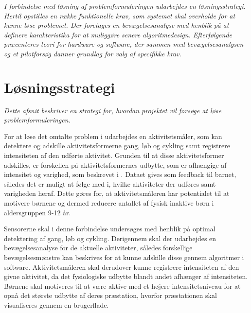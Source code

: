 \textit{I forbindelse med løsning af problemformuleringen udarbejdes en løsningsstrategi. Hertil opstilles en række funktionelle krav, som systemet skal overholde for at kunne løse problemet. Der foretages en bevægelsesanalyse med henblik på at definere karakteristika for at muliggøre senere algoritmedesign. Efterfølgende præcenteres teori for hardware og software, der sammen med bevægelsesanalysen og et pilotforsøg danner grundlag for valg af specifikke krav.}

\section{Løsningsstrategi}
\textit{Dette afsnit beskriver en strategi for, hvordan projektet vil forsøge at løse problemformuleringen.}

For at løse det omtalte problem i  udarbejdes en aktivitetsmåler, som kan detektere og adskille aktivitetsformerne gang, løb og cykling samt registrere intensiteten af den udførte aktivitet. Grunden til at disse aktivitetsformer adskilles, er forskellen på aktivitetsformernes udbytte, som er afhængige af intensitet og varighed, som beskrevet i . Dataet gives som feedback til barnet, således det er muligt at følge med i, hvilke aktiviteter der udføres samt varigheden heraf. Dette gøres for, at aktivitetsmåleren har potentialet til at motivere børnene og dermed reducere antallet af fysisk inaktive børn i aldersgruppen 9-12 år.

Sensorerne skal i denne forbindelse undersøges med henblik på optimal detektering af gang, løb og cykling. Derigennem skal der udarbejdes en bevægelsesanalyse for de aktuelle aktiviteter, således forskellige bevægelsesmønstre kan beskrives for at kunne adskille disse gennem algoritmer i software. Aktivitetsmåleren skal derudover kunne registrere intensiteten af den givne aktivitet, da det fysiologiske udbytte blandt andet afhænger af intensiteten. Børnene skal motiveres til at være aktive med et højere intensitetsniveau for at opnå det største udbytte af deres præstation, hvorfor præstationen skal visualiseres gennem en brugerflade.%


